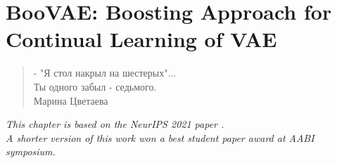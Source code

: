 \chapter{BooVAE: Boosting Approach for Continual Learning of VAE}\label{chap:boovae}


\begin{quote}
\normalsize\itshape
\begin{flushright}
\foreignlanguage{russian}{- "Я стол накрыл на шестерых"...}\\
\foreignlanguage{russian}{Ты одного забыл - седьмого.}  \\
\foreignlanguage{russian}{Марина Цветаева} \\ \vskip 20pt
\end{flushright}
\end{quote}


\begin{flushright}
	\small{
		\textit{
			\hfill This chapter is based on the NeurIPS 2021 paper \citep{egorov2021boovae}.\\ 
			\hfill A shorter version of this work won a best student paper award at AABI symposium.
		} 
		
	}
\end{flushright}

